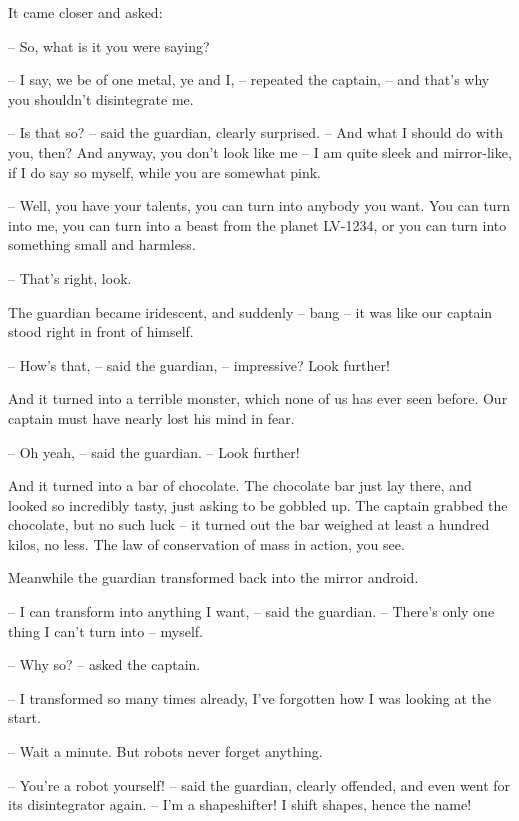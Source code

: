 \documentclass[ebook,oneside,final,openright]{memoir}
\begin{document}
\par
It came closer and asked:\par
– So, what is it you were saying?\par
– I say, we be of one metal, ye and I, – repeated the captain, – and that’s why you shouldn’t disintegrate me.\par
– Is that so? – said the guardian, clearly surprised. – And what I should do with you, then? And anyway, you don’t look like me – I am quite sleek and mirror-like, if I do say so myself, while you are somewhat pink.\par
– Well, you have your talents, you can turn into anybody you want. You can turn into me, you can turn into a beast from the planet LV-1234, or you can turn into something small and harmless.\par
– That’s right, look.\par
\par
The guardian became iridescent, and suddenly – bang – it was like our captain stood right in front of himself.\par
– How’s that, – said the guardian, – impressive? Look further!\par
And it turned into a terrible monster, which none of us has ever seen before. Our captain must have nearly lost his mind in fear.\par
– Oh yeah, – said the guardian. – Look further!\par
\par
And it turned into a bar of chocolate. The chocolate bar just lay there, and looked so incredibly tasty, just asking to be gobbled up. The captain grabbed the chocolate, but no such luck – it turned out the bar weighed at least a hundred kilos, no less. The law of conservation of mass in action, you see.\par
\par
Meanwhile the guardian transformed back into the mirror android.\par
– I can transform into anything I want, – said the guardian. – There’s only one thing I can’t turn into – myself.\par
– Why so? – asked the captain.\par
– I transformed so many times already, I’ve forgotten how I was looking at the start.\par
– Wait a minute. But robots never forget anything.\par
– You’re a robot yourself! – said the guardian, clearly offended, and even went for its disintegrator again. – I’m a shapeshifter! I shift shapes, hence the name!\par
\end{document}
